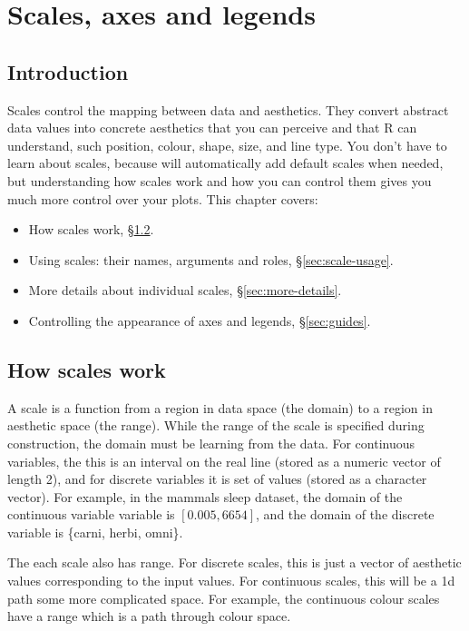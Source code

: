 
\chapter{Scales, axes and legends}

\section{Introduction}

Scales control the mapping between data and aesthetics.  They convert abstract data values into concrete aesthetics that you can perceive and that R can understand, such position, colour, shape, size, and line type.  You don't have to learn about scales, because \ggplot will automatically add default scales when needed, but understanding how scales work and how you can control them gives you much more control over your plots. This chapter covers:

\begin{itemize}
  \item How scales work, \S \ref{sec:how-scales-work}.
  \item Using scales: their names, arguments and roles, \S \ref{sec:scale-usage}.
  \item More details about individual scales, \S \ref{sec:more-details}.
  \item Controlling the appearance of axes and legends, \S \ref{sec:guides}.
\end{itemize}

\section{How scales work}
\label{sec:how-scales-work}

A scale is a function from a region in data space (the domain) to a region in aesthetic space (the range).  While the range of the scale is specified during construction, the domain must be learning from the data. For continuous variables, the this is an interval on the real line (stored as a numeric vector of length 2), and for discrete variables it is set of values (stored as a character vector).  For example, in the mammals sleep dataset, the domain of the continuous variable  variable is $[0.005, 6654]$, and the domain of the discrete variable  is \{carni, herbi, omni\}.

The each scale also has range.  For discrete scales, this is just a vector of aesthetic values corresponding to the input values.  For continuous scales, this will be a 1d path some more complicated space.  For example, the continuous colour scales have a range which is a path through colour space.

